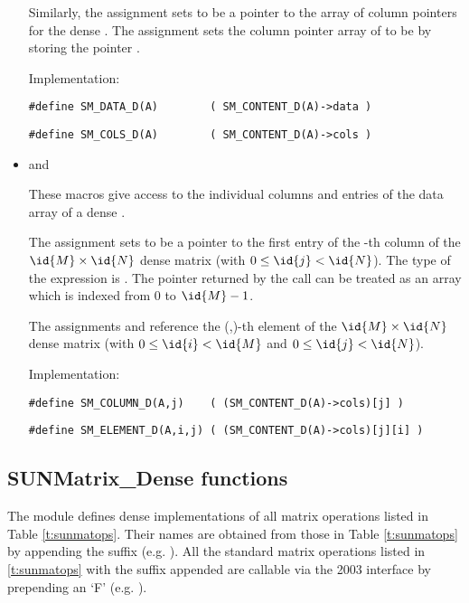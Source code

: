 \begin{itemize}
  Similarly, the assignment  sets  to be     
  a pointer to the array of column pointers for the dense  . 
  The assignment  sets the column pointer
  array of  to be  by storing the pointer .                   
  
  Implementation:

  \verb|#define SM_DATA_D(A)        ( SM_CONTENT_D(A)->data )|

  \verb|#define SM_COLS_D(A)        ( SM_CONTENT_D(A)->cols )|


\item {} and 
                                                            
  These macros give access to the individual columns and entries of
  the data array of a dense .

  The assignment  sets  to be
  a pointer to the first entry of the -th column of the $\id{M} \times \id{N}$
  dense matrix  (with $0 \le \id{j} < \id{N}$).  The type of the
  expression  is .  The pointer
  returned by the call  can be treated as  
  an array which is indexed from $0$ to $\id{M}-1$.

  The assignments  and  reference the (,)-th element of the
  $\id{M} \times \id{N}$ dense matrix  (with $0 \le \id{i} < \id{M}$ and
  $0 \le \id{j} < \id{N}$).

  Implementation:

  \verb|#define SM_COLUMN_D(A,j)    ( (SM_CONTENT_D(A)->cols)[j] )|

  \verb|#define SM_ELEMENT_D(A,i,j) ( (SM_CONTENT_D(A)->cols)[j][i] )|

\end{itemize}


\subsection{SUNMatrix\_Dense functions}
\label{ss:sunmat_dense_functions}

The {\sunmatdense} module defines dense implementations of all matrix
operations listed in Table \ref{t:sunmatops}. Their names are obtained
from those in Table \ref{t:sunmatops} by appending the
suffix  (e.g. ). 
All the standard matrix operations listed in \ref{t:sunmatops} with the suffix
 appended are callable via the {\F} 2003 interface by prepending an
`F' (e.g. ).

